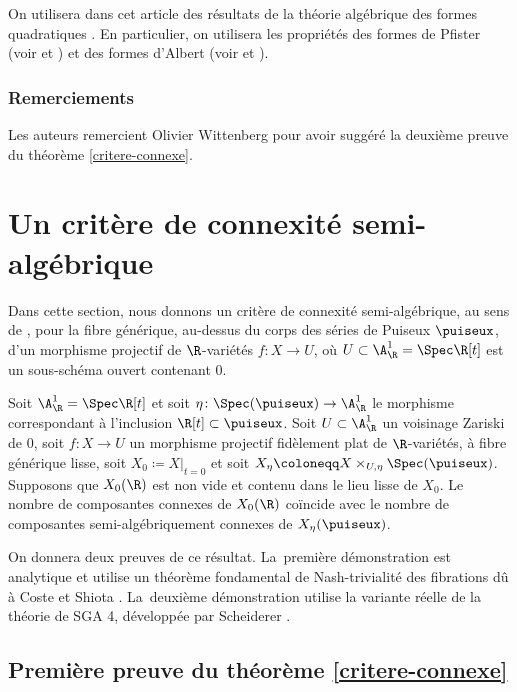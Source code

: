 On utilisera dans cet article des résultats de la théorie algébrique des formes quadratiques \cite{lam2005introduction, kahn2008formes}. En particulier, on utilisera les propriétés des formes de Pfister (voir \cite[Ch.\,X]{lam2005introduction} et \cite[Ch.\,2]{kahn2008formes}) et des formes d'Albert (voir \cite[(4.7) p.\,69, Albert's Th.\,4.8]{lam2005introduction} et \cite[Déf.\,5.7.7, Lem.\,8.1.4]{kahn2008formes}).

\subsubsection*{Remerciements}
Les auteurs remercient Olivier Wittenberg pour avoir suggéré la deuxième preuve du théorème \ref{critere-connexe}.

\section{Un critère de connexité semi-algébrique}\label{ehres}

Dans cette section, nous donnons un critère de connexité semi-algébrique, au sens de \cite[Def.\,2.4.2]{bochnak1998real}, pour la fibre générique, au-dessus du corps des séries de Puiseux $\puiseux$, d'un morphisme projectif de $\R$-variétés $f\colon X\to U$, où $U\subset \A^1_\R=\Spec \R[t]$ est un sous-schéma ouvert contenant $0$.

\begin{thm}\label{critere-connexe}
Soit $\A^1_\R=\Spec \R[t]$ et soit $\eta\colon \Spec(\puiseux)\to \A^1_\R$ le morphisme correspondant à l'inclusion $\R[t]\subset \puiseux$. Soit $U\subset \A^1_\R$ un voisinage Zariski de $0$, soit $f\colon X\to U$ un morphisme projectif fidèlement plat de $\R$-variétés, à fibre générique lisse, soit $X_0\coloneqq X|_{t=0}$ et soit $X_\eta\coloneqq X\times_{U,\eta}\Spec(\puiseux)$. Supposons que $X_0(\R)$ est non vide et contenu dans le lieu lisse de $X_0$. Le nombre de composantes connexes de $X_0(\R)$ coïncide avec le nombre de composantes semi-algébriquement connexes de $X_\eta(\puiseux)$.
\end{thm}

On donnera deux preuves de ce résultat. La~première démonstration est analytique et utilise un théorème fondamental de Nash-trivialité des fibrations dû à Coste et Shiota \cite{coste1992nash}. La~deuxième démonstration utilise la variante réelle de la théorie de SGA 4, développée par Scheiderer \cite{scheiderer1994real}.

\subsection{Première preuve du théorème \ref{critere-connexe}}

